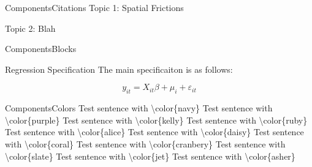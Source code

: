 \documentclass[aspectratio=43]{beamer}
\begin{document}
\begin{frame}{Components}{Citations}
    Topic 1: Spatial Frictions
    \begin{citecolor}
    \end{citecolor}

    \vspace{5mm}
    Topic 2: Blah 
    \begin{citecolor}
    \end{citecolor}
\end{frame}

\begin{frame}{Components}{Blocks}
    \begin{block}{Regression Specification}
        The main specificaiton is as follows: 

        \[
            y_{it} = X_{it} \beta + \mu_i + \varepsilon_{it}
        \]
    \end{block}
\end{frame}

\begin{frame}{Components}{Colors}
    {\color{navy} Test sentence with \textbackslash color\{navy\}}\newline
    {\color{purple} Test sentence with \textbackslash color\{purple\}}\newline
    {\color{kelly} Test sentence with \textbackslash color\{kelly\}}\newline
    {\color{ruby} Test sentence with \textbackslash color\{ruby\}}\newline
    {\color{alice} Test sentence with \textbackslash color\{alice\}}\newline
    {\color{daisy} Test sentence with \textbackslash color\{daisy\}}\newline
    {\color{coral} Test sentence with \textbackslash color\{coral\}}\newline
    {\color{cranberry} Test sentence with \textbackslash color\{cranbery\}}\newline
    {\color{slate} Test sentence with \textbackslash color\{slate\}}\newline
    {\color{jet} Test sentence with \textbackslash color\{jet\}}\newline
    {\color{asher} Test sentence with \textbackslash color\{asher\}}\newline
\end{frame}
\end{document}
